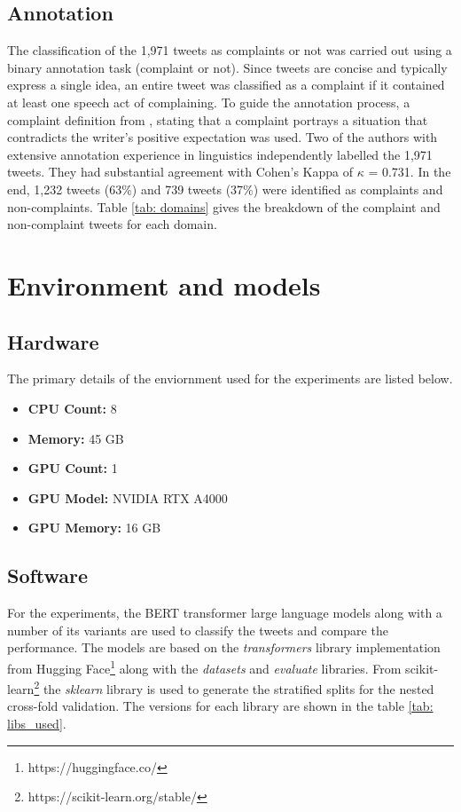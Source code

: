 \subsection{Annotation}
The classification of the 1,971 tweets as complaints or not was carried out using a binary annotation task (complaint or not). Since tweets are concise and typically express a single idea, an entire tweet was classified as a complaint if it contained at least one speech act of complaining. To guide the annotation process, a complaint definition from \cite{olshtain_speechact_1987}, stating that a complaint portrays a situation that contradicts the writer's positive expectation was used. Two of the authors with extensive annotation experience in linguistics independently labelled the 1,971 tweets. They had substantial agreement \cite{artsteinInterCoderAgreementComputational2008} with Cohen's Kappa of $\kappa$ = 0.731. In the end, 1,232 tweets (63\%) and 739 tweets (37\%) were identified as complaints and non-complaints. Table \ref{tab: domains} gives the breakdown of the complaint and non-complaint tweets for each domain.

\section{Environment and models}

\subsection{Hardware}
The primary details of the enviornment used for the experiments are listed below. 
\begin{itemize}
    \item \textbf{CPU Count:} 8
    \item \textbf{Memory:} 45 GB
    \item \textbf{GPU Count:} 1
    \item \textbf{GPU Model:} NVIDIA RTX A4000
    \item \textbf{GPU Memory:} 16 GB
\end{itemize}

\subsection{Software}
For the experiments, the BERT transformer large language models along with a number of its variants are used to classify the tweets and compare the performance. The models are based on the \textit{transformers} library implementation from Hugging Face\footnote{https://huggingface.co/} along with the \textit{datasets} and \textit{evaluate} libraries. From scikit-learn\footnote{https://scikit-learn.org/stable/} the \textit{sklearn} library is used to generate the stratified splits for the nested cross-fold validation. The versions for each library are shown in the table \ref{tab: libs_used}.

